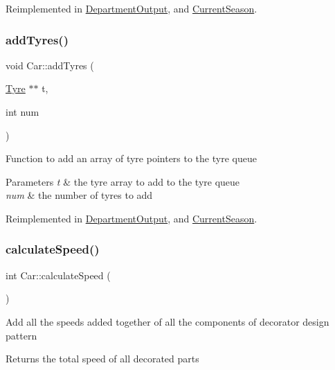 Reimplemented in \hyperlink{classDepartmentOutput_a6ce74748aa402298902e378ff47c1e49}{Department\+Output}, and \hyperlink{classCurrentSeason_a2ae9598222bc7aba71040775c019f297}{Current\+Season}.

\mbox{\label{classCar_a5c5f22cb9232b88a53a4ffc324824aa1}} 
\subsubsection{\texorpdfstring{add\+Tyres()}{addTyres()}}
{\footnotesize\ttfamily void Car\+::add\+Tyres (\begin{DoxyParamCaption}\item[{\hyperlink{classTyre}{Tyre} $\ast$$\ast$}]{t,  }\item[{int}]{num }\end{DoxyParamCaption})\hspace{0.3cm}{\ttfamily [virtual]}}

Function to add an array of tyre pointers to the tyre queue 
\begin{DoxyParams}{Parameters}
{\em t} & the tyre array to add to the tyre queue \\
\hline
{\em num} & the number of tyres to add \\
\hline
\end{DoxyParams}


Reimplemented in \hyperlink{classDepartmentOutput_a7f231762cf94d1f18a2e7bb3290afbda}{Department\+Output}, and \hyperlink{classCurrentSeason_a62e6e6c10c5490084230d4c3722196e5}{Current\+Season}.

\mbox{\label{classCar_aadb72568edbdf571547ec48e9781237f}} 
\subsubsection{\texorpdfstring{calculate\+Speed()}{calculateSpeed()}}
{\footnotesize\ttfamily int Car\+::calculate\+Speed (\begin{DoxyParamCaption}{ }\end{DoxyParamCaption})\hspace{0.3cm}{\ttfamily [virtual]}}

Add all the speeds added together of all the components of decorator design pattern \begin{DoxyReturn}{Returns}
the total speed of all decorated parts 
\end{DoxyReturn}


